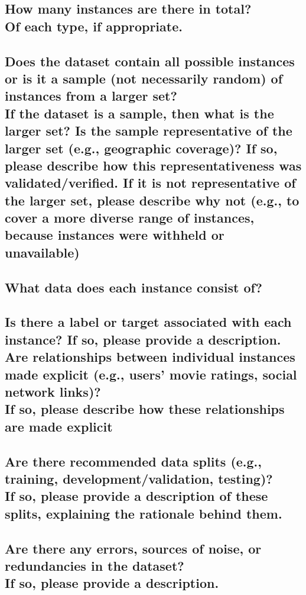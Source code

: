 \documentclass[letterpaper, 10 pt, conference]{ieeeconf}  %
\newcommand{\subtitle}[1]{{\\ \small \normalfont \color{purple} #1}}
\begin{document}
\lipsum[1]

\subsection{How many instances are there in total? \subtitle{Of each type, if appropriate.}}

\lipsum[1]

\subsection{Does the dataset contain all possible instances or is it a sample (not necessarily random) of instances from a larger set? \subtitle{If the dataset is a sample, then what is the larger set? Is the sample representative of the larger set (e.g., geographic coverage)? If so, please describe how this representativeness was validated/verified. If it is not representative of the larger set, please describe why not (e.g., to cover a more diverse range of instances, because instances were withheld or unavailable)}}

\lipsum[1]

\subsection{What data does each instance consist of?}

\lipsum[1]

\subsection{Is there a label or target associated with each instance? If so, please provide a description. Are relationships between individual instances made explicit (e.g., users’ movie ratings, social network links)? \subtitle{If so, please describe how these relationships are made explicit}}

\lipsum[1]

\subsection{Are there recommended data splits (e.g., training, development/validation, testing)? \subtitle{If so, please provide a description of these splits, explaining the rationale behind them.}}

\lipsum[1]

\subsection{Are there any errors, sources of noise, or redundancies in the dataset? \subtitle{If so, please provide a description.}}
\end{document}
